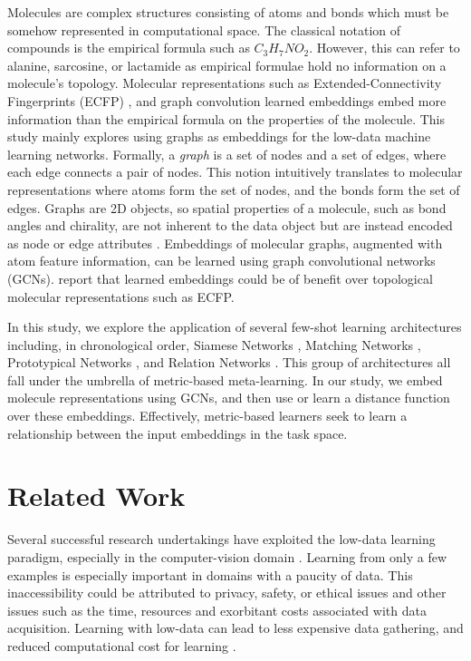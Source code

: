 Molecules are complex structures consisting of atoms and bonds which must be somehow represented in computational space. The classical notation of compounds is the empirical formula such as $C_3H_7NO_2$. However, this can refer to alanine, sarcosine, or lactamide as empirical formulae hold no information on a molecule's topology. Molecular representations such as Extended-Connectivity Fingerprints (ECFP) \cite{rogers2010extended}, and graph convolution learned embeddings \cite{duvenaud2015convolutional} embed more information than the empirical formula on the properties of the molecule. This study mainly explores using graphs as embeddings for the low-data machine learning networks. Formally, a \textit{graph} is a set of nodes and a set of edges, where each edge connects a pair of nodes. This notion intuitively translates to molecular representations where atoms form the set of nodes, and the bonds form the set of edges. Graphs are 2D objects, so spatial properties of a molecule, such as bond angles and chirality, are not inherent to the data object but are instead encoded as node or edge attributes \cite{david2020molecular}. Embeddings of molecular graphs, augmented with atom feature information, can be learned using graph convolutional networks (GCNs). \citet{wu2018moleculenet} report that learned embeddings could be of benefit over topological molecular representations such as ECFP.

In this study, we explore the application of several few-shot learning architectures including, in chronological order, Siamese Networks \citep{koch2015siamese}, Matching Networks \citep{vinyals2016matching}, Prototypical Networks \citep{snell2017prototypical}, and Relation Networks \citep{sung2018learning}. This group of architectures all fall under the umbrella of metric-based meta-learning. In our study, we embed molecule representations using GCNs, and then use or learn a distance function over these embeddings. Effectively, metric-based learners seek to learn a relationship between the input embeddings in the task space. 

\section{Related Work}

Several successful research undertakings have exploited the low-data learning paradigm, especially in the computer-vision domain \cite{koch2015siamese, vinyals2016matching, snell2017prototypical, sung2018learning}. Learning from only a few examples is especially important in domains with a paucity of data. This inaccessibility could be attributed to privacy, safety, or ethical issues and other issues such as the time, resources and exorbitant costs associated with data acquisition. Learning with low-data can lead to less expensive data gathering, and reduced computational cost for learning \cite{wang2020generalizing}.

